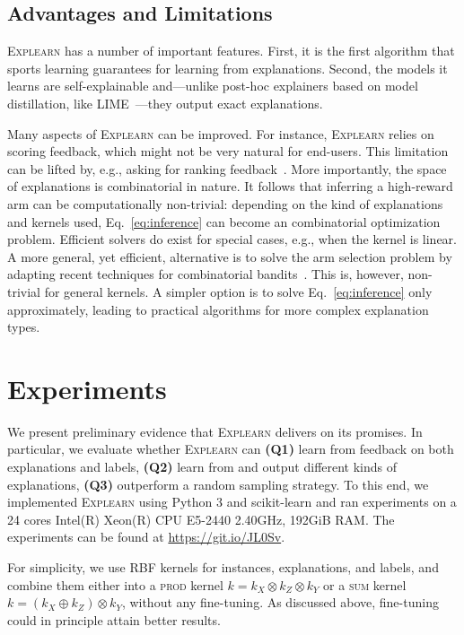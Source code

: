 \documentclass[letterpaper]{article} %
\newcommand{\explearn}{\textsc{Explearn}\xspace}
\begin{document}
\subsection{Advantages and Limitations}

\explearn has a number of important features.  First, it is the first algorithm that sports learning guarantees for learning from explanations.  Second, the models it learns are self-explainable and---unlike post-hoc explainers based on model distillation, like LIME~\cite{ribeiro2016should}---they output exact explanations.

Many aspects of \explearn can be improved.  For instance, \explearn relies on scoring feedback, which might not be very natural for end-users.  This limitation can be lifted by, e.g., asking for ranking feedback~\cite{guo2010gaussian}.  More importantly, the space of explanations is combinatorial in nature.  It follows that inferring a high-reward arm can be computationally non-trivial:  depending on the kind of explanations and kernels used, Eq.~\ref{eq:inference} can become an {\NPhard} combinatorial optimization problem.  Efficient solvers do exist for special cases, e.g., when the kernel is linear.  A more general, yet efficient, alternative is to solve the arm selection problem by adapting recent techniques for combinatorial bandits~\cite{koriche2018compiling,sakaue2018efficient}.  This is, however, non-trivial for general kernels.  A simpler option is to solve Eq.~\ref{eq:inference} only approximately, leading to practical algorithms for more complex explanation types.

\section{Experiments}
\label{sec:experiments}

We present preliminary evidence that \explearn delivers on its promises.  In particular, we evaluate whether \explearn can \textbf{(Q1)} learn from feedback on both explanations and labels, \textbf{(Q2)} learn from and output different kinds of explanations, \textbf{(Q3)} outperform a random sampling strategy.  To this end, we implemented \explearn using Python 3 and scikit-learn and ran experiments on a 24 cores Intel(R) Xeon(R) CPU E5-2440 2.40GHz, 192GiB RAM.  The experiments can be found at \url{https://git.io/JL0Sv}.


  For simplicity, we use RBF kernels for instances, explanations, and labels, and combine them either into a \textsc{prod} kernel $k = k_X \otimes k_Z \otimes k_Y$ or a \textsc{sum} kernel $k = (k_X \oplus k_Z) \otimes k_Y$, without any fine-tuning.  As discussed above, fine-tuning  could in principle attain better results.
\end{document}
